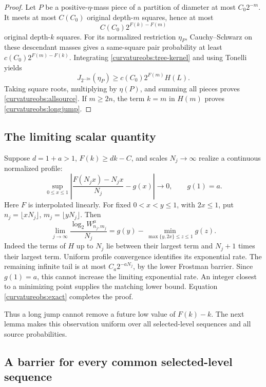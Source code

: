 \begin{proof}
Let \(P\) be a positive-\(\eta\)-mass piece of a partition of diameter
at most \(C_0 2^{-m}\). It meets at most \(C(C_0)\) original
depth-\(m\) squares, hence at most
\[
 C(C_0)2^{F(k)-F(m)}
\]
original depth-\(k\) squares. For its normalized restriction \(\eta_P\),
Cauchy--Schwarz on these descendant masses gives a same-square pair
probability at least
\(c(C_0)2^{F(m)-F(k)}\). Integrating
\eqref{curvatureobs:tree-kernel} and using Tonelli yields
\[
 J_{2^{-2n}}(\eta_P)
 \ge c(C_0)2^{F(m)}H(L).
\]
Taking square roots, multiplying by \(\eta(P)\), and summing all pieces
proves \eqref{curvatureobs:allsource}. If \(m\ge2n\), the term \(k=m\)
in \(H(m)\) proves \eqref{curvatureobs:longjump}.
\end{proof}

\subsection{The limiting scalar quantity}

Suppose \(d=1+a>1\), \(F(k)\ge dk-C\), and scales \(N_j\to\infty\)
realize a continuous normalized profile:
\[
 \sup_{0\le x\le1}
 \left|\frac{F(N_jx)-N_jx}{N_j}-g(x)\right|\longrightarrow0,
 \qquad g(1)=a.
\]
Here \(F\) is interpolated linearly. For fixed
\(0<x<y\le1\), with \(2x\le1\), put
\(n_j=\lfloor xN_j\rfloor\), \(m_j=\lfloor yN_j\rfloor\).
Then
\begin{equation}\label{curvatureobs:profile-limit}
 \lim_{j\to\infty}\frac{\log_2 W^\mu_{n_j,m_j}}{N_j}
 =
 g(y)-\min_{\max\{y,2x\}\le z\le1}g(z).
\end{equation}
Indeed the terms of \(H\) up to \(N_j\) lie between their largest
term and \(N_j+1\) times their largest term. Uniform profile convergence
identifies its exponential rate. The remaining infinite tail is at most
\(C_a2^{-aN_j}\), by the lower Frostman barrier. Since \(g(1)=a\),
this cannot increase the limiting exponential rate. An integer closest
to a minimizing point supplies the matching lower bound. Equation
\eqref{curvatureobs:exact} completes the proof.

Thus a long jump cannot remove a future low value of \(F(k)-k\).
The next lemma makes this observation uniform over all selected-level
sequences and all source probabilities.

\subsection{A barrier for every common selected-level sequence}

